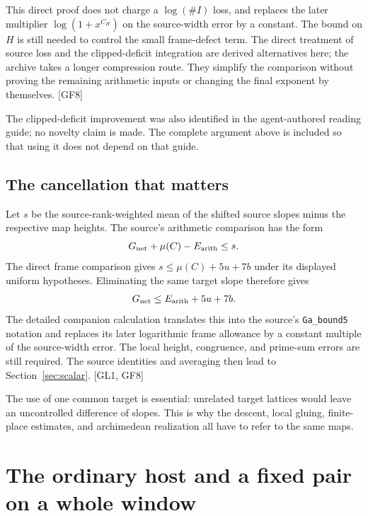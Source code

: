 \documentclass[11pt,a4paper]{article}
\numberwithin{equation}{section}
\theoremstyle{remark}\newtheorem{remark}[theorem]{Remark}
\begin{document}
This direct proof does not charge a $\log(\#I)$ loss, and replaces the
later multiplier $\log(1+x^{C_H})$ on the source-width error by a constant.
The bound on $H$ is still needed to control the small frame-defect term.
The direct treatment of source loss and the clipped-deficit integration are
derived alternatives here; the archive takes a longer compression route.
They simplify the comparison without proving the remaining arithmetic
inputs or changing the final exponent by themselves. \textsf{[GF8]}

The clipped-deficit improvement was also identified in the agent-authored reading guide; no novelty claim is made. The complete argument above is included so that using it does not depend on that guide.\cite{guide}

\subsection{The cancellation that matters}

Let $s$ be the source-rank-weighted mean of the shifted source slopes minus the respective map heights. The source's arithmetic comparison has the form
\[
G_{\rm net}+\mu(C)-E_{\rm arith}\le s.
\]
The direct frame comparison gives $s\le\mu(C)+5u+7b$ under its displayed uniform hypotheses. Eliminating the same target slope therefore gives
\begin{equation}\label{eq:cancel}
G_{\rm net}\le E_{\rm arith}+5u+7b.
\end{equation}
The detailed companion calculation translates this into the source's \texttt{Ga\_bound5} notation and replaces its later logarithmic frame allowance by a constant multiple of the source-width error. The local height, congruence, and prime-sum errors are still required. The source identities and averaging then lead to Section~\ref{sec:scalar}. \textsf{[GL1, GF8]}\cite{congruence,chtop}

The use of one common target is essential: unrelated target lattices would leave an uncontrolled difference of slopes. This is why the descent, local gluing, finite-place estimates, and archimedean realization all have to refer to the same maps.

\section{The ordinary host and a fixed pair on a whole window}\label{sec:ordinary-host}
\end{document}

